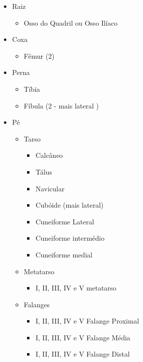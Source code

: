 \documentclass[
]{book}
\providecommand{\tightlist}{%
  \setlength{\itemsep}{0pt}\setlength{\parskip}{0pt}}
\begin{document}
\begin{itemize}
\tightlist
\item
  Raiz

  \begin{itemize}
  \tightlist
  \item
    Osso do Quadril ou Osso Ilíaco
  \end{itemize}
\item
  Coxa

  \begin{itemize}
  \tightlist
  \item
    Fêmur (2)
  \end{itemize}
\item
  Perna

  \begin{itemize}
  \tightlist
  \item
    Tíbia
  \item
    Fíbula (2 - mais lateral )
  \end{itemize}
\item
  Pé

  \begin{itemize}
  \tightlist
  \item
    Tarso

    \begin{itemize}
    \tightlist
    \item
      Calcâneo
    \item
      Tálus
    \item
      Navicular
    \item
      Cubóide (mais lateral)
    \item
      Cuneiforme Lateral
    \item
      Cuneiforme intermédio
    \item
      Cuneiforme medial
    \end{itemize}
  \item
    Metatarso

    \begin{itemize}
    \tightlist
    \item
      I, II, III, IV e V metatarso
    \end{itemize}
  \item
    Falanges

    \begin{itemize}
    \tightlist
    \item
      I, II, III, IV e V Falange Proximal
    \item
      I, II, III, IV e V Falange Média
    \item
      I, II, III, IV e V Falange Distal
    \end{itemize}
  \end{itemize}
\end{itemize}
\end{document}

